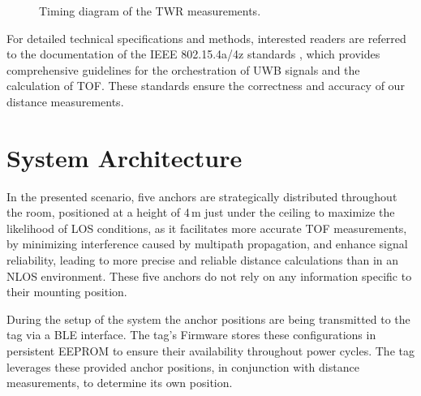\documentclass[conference, a4paper]{IEEEtran}
\begin{document}
\begin{figure}[hbt!]
	\centering
	\caption{Timing diagram of the \ac{TWR} measurements.}
	\label{fig:csvbarchart}
\end{figure}

For detailed technical specifications and methods, interested readers are referred to the documentation of the IEEE 802.15.4a/4z standards \cite{IEEE802154a} \cite{IEEE802154z}, which provides comprehensive guidelines for the orchestration of \ac{UWB} signals and the calculation of \ac{TOF}.
These standards ensure the correctness and accuracy of our distance measurements.

\section{System Architecture}\label{section:system_arch}
In the presented scenario, five anchors are strategically distributed throughout the room,
positioned at a height of 4\,m just under the ceiling to maximize the likelihood of 
\ac{LOS} conditions, as it facilitates more accurate \ac{TOF} measurements, by minimizing interference caused by multipath propagation, and enhance signal reliability, leading to more precise and reliable distance calculations than in an \ac{NLOS} environment.
These five anchors do not rely on any information specific to their mounting position.

During the setup of the system the anchor positions are being transmitted to the tag via a \ac{BLE} interface.
The tag's Firmware stores these configurations in persistent \ac{EEPROM} to ensure their availability throughout power cycles.
The tag leverages these provided anchor positions, in conjunction with distance measurements, to determine its own position. 
\end{document}
